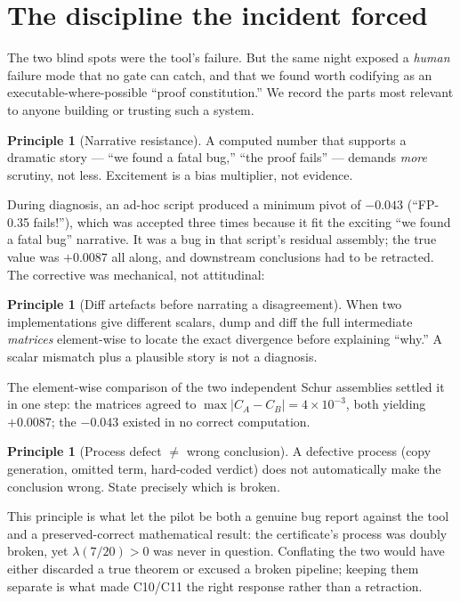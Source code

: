 \documentclass[11pt,a4paper]{amsart}
\theoremstyle{plain}
\theoremstyle{definition}
\newtheorem{principle}[theorem]{Principle}
\newcommand{\CtenA}{\textsf{C10}}
\newcommand{\CelevenA}{\textsf{C11}}
\begin{document}
\section{The discipline the incident forced}
\label{sec:constitution}

The two blind spots were the tool's failure. But the same night exposed a
\emph{human} failure mode that no gate can catch, and that we found worth
codifying as an executable-where-possible ``proof constitution.'' We record the
parts most relevant to anyone building or trusting such a system.

\begin{principle}[Narrative resistance]
\label{prin:narrative}
A computed number that supports a dramatic story --- ``we found a fatal bug,''
``the proof fails'' --- demands \emph{more} scrutiny, not less. Excitement is a
bias multiplier, not evidence.
\end{principle}

During diagnosis, an ad-hoc script produced a minimum pivot of $-0.043$
(``FP-0.35 fails!''), which was accepted three times because it fit the exciting
``we found a fatal bug'' narrative. It was a bug in that script's residual
assembly; the true value was $+0.0087$ all along, and downstream conclusions had
to be retracted. The corrective was mechanical, not attitudinal:

\begin{principle}[Diff artefacts before narrating a disagreement]
When two implementations give different scalars, dump and diff the full
intermediate \emph{matrices} element-wise to locate the exact divergence before
explaining ``why.'' A scalar mismatch plus a plausible story is not a diagnosis.
\end{principle}

The element-wise comparison of the two independent Schur assemblies settled it in
one step: the matrices agreed to $\max|C_A-C_B| = 4\times10^{-3}$, both yielding
$+0.0087$; the $-0.043$ existed in no correct computation.

\begin{principle}[Process defect $\neq$ wrong conclusion]
A defective process (copy generation, omitted term, hard-coded verdict) does not
automatically make the conclusion wrong. State precisely which is broken.
\end{principle}

This principle is what let the pilot be both a genuine bug report against the
tool and a preserved-correct mathematical result: the certificate's process was
doubly broken, yet $\lambda(7/20)>0$ was never in question. Conflating the two
would have either discarded a true theorem or excused a broken pipeline; keeping
them separate is what made \CtenA{}/\CelevenA{} the right response rather than a
retraction.
\end{document}
